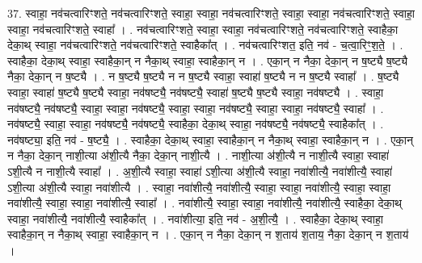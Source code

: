 \documentclass[17pt]{extarticle}
\begin{document}
37. स्वाहा॒ नव॑चत्वारिꣳशते॒ नव॑चत्वारिꣳशते॒ स्वाहा॒ स्वाहा॒ नव॑चत्वारिꣳशते॒ स्वाहा॒ स्वाहा॒ नव॑चत्वारिꣳशते॒ स्वाहा॒ स्वाहा॒ नव॑चत्वारिꣳशते॒ स्वाहा᳚ । . नव॑चत्वारिꣳशते॒ स्वाहा॒ स्वाहा॒ नव॑चत्वारिꣳशते॒ नव॑चत्वारिꣳशते॒ स्वाहैका॒ देका॒थ् स्वाहा॒ नव॑चत्वारिꣳशते॒ नव॑चत्वारिꣳशते॒ स्वाहैका᳚त् । . नव॑चत्वारिꣳशत॒ इति॒ नव॑ - च॒त्वा॒रिꣳ॒॒श॒ते॒ । . स्वाहैका॒ देका॒थ् स्वाहा॒ स्वाहैका॒न् न नैका॒थ् स्वाहा॒ स्वाहैका॒न् न । . एका॒न् न नैका॒ देका॒न् न ष॒ष्ट्यै ष॒ष्ट्यै नैका॒ देका॒न् न ष॒ष्ट्यै । . न ष॒ष्ट्यै ष॒ष्ट्यै न न ष॒ष्ट्यै स्वाहा॒ स्वाहा॑ ष॒ष्ट्यै न न ष॒ष्ट्यै स्वाहा᳚ । . ष॒ष्ट्यै स्वाहा॒ स्वाहा॑ ष॒ष्ट्यै ष॒ष्ट्यै स्वाहा॒ नव॑षष्ट्यै॒ नव॑षष्ट्यै॒ स्वाहा॑ ष॒ष्ट्यै ष॒ष्ट्यै स्वाहा॒ नव॑षष्ट्यै । . स्वाहा॒ नव॑षष्ट्यै॒ नव॑षष्ट्यै॒ स्वाहा॒ स्वाहा॒ नव॑षष्ट्यै॒ स्वाहा॒ स्वाहा॒ नव॑षष्ट्यै॒ स्वाहा॒ स्वाहा॒ नव॑षष्ट्यै॒ स्वाहा᳚ । . नव॑षष्ट्यै॒ स्वाहा॒ स्वाहा॒ नव॑षष्ट्यै॒ नव॑षष्ट्यै॒ स्वाहैका॒ देका॒थ् स्वाहा॒ नव॑षष्ट्यै॒ नव॑षष्ट्यै॒ स्वाहैका᳚त् । . नव॑षष्ट्या॒ इति॒ नव॑ - ष॒ष्ट्यै॒ । . स्वाहैका॒ देका॒थ् स्वाहा॒ स्वाहैका॒न् न नैका॒थ् स्वाहा॒ स्वाहैका॒न् न । . एका॒न् न नैका॒ देका॒न् नाशी॒त्या अ॑शी॒त्यै नैका॒ देका॒न् नाशी॒त्यै । . नाशी॒त्या अ॑शी॒त्यै न नाशी॒त्यै स्वाहा॒ स्वाहा॑ ऽशी॒त्यै न नाशी॒त्यै स्वाहा᳚ । . अ॒शी॒त्यै स्वाहा॒ स्वाहा॑ ऽशी॒त्या अ॑शी॒त्यै स्वाहा॒ नवा॑शीत्यै॒ नवा॑शीत्यै॒ स्वाहा॑ ऽशी॒त्या अ॑शी॒त्यै स्वाहा॒ नवा॑शीत्यै । . स्वाहा॒ नवा॑शीत्यै॒ नवा॑शीत्यै॒ स्वाहा॒ स्वाहा॒ नवा॑शीत्यै॒ स्वाहा॒ स्वाहा॒ नवा॑शीत्यै॒ स्वाहा॒ स्वाहा॒ नवा॑शीत्यै॒ स्वाहा᳚ । . नवा॑शीत्यै॒ स्वाहा॒ स्वाहा॒ नवा॑शीत्यै॒ नवा॑शीत्यै॒ स्वाहैका॒ देका॒थ् स्वाहा॒ नवा॑शीत्यै॒ नवा॑शीत्यै॒ स्वाहैका᳚त् । . नवा॑शीत्या॒ इति॒ नव॑ - अ॒शी॒त्यै॒ । . स्वाहैका॒ देका॒थ् स्वाहा॒ स्वाहैका॒न् न नैका॒थ् स्वाहा॒ स्वाहैका॒न् न । . एका॒न् न नैका॒ देका॒न् न श॒ताय॑ श॒ताय॒ नैका॒ देका॒न् न श॒ताय॑ । \newline
\end{document}
